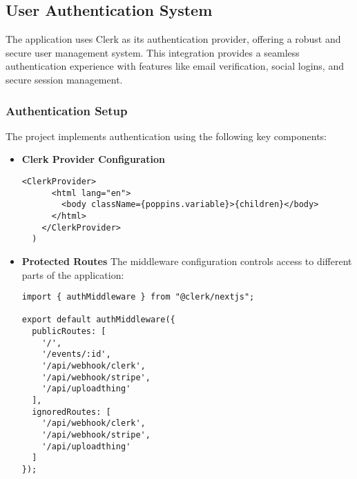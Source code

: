 \subsection{User Authentication System}
The application uses Clerk as its authentication provider, offering a robust and secure user management system. This integration provides a seamless authentication experience with features like email verification, social logins, and secure session management.

\subsubsection{Authentication Setup}
The project implements authentication using the following key components:
\begin{itemize}
    \item \textbf{Clerk Provider Configuration} 
\begin{lstlisting}[style=typescript, caption={Clerk Provider Configuration}]
    <ClerkProvider>
      <html lang="en">
        <body className={poppins.variable}>{children}</body>
      </html>
    </ClerkProvider>
  )
\end{lstlisting}

    \item \textbf{Protected Routes}  
    The middleware configuration controls access to different parts of the application:
\begin{lstlisting}[style=typescript, caption={middleware configuration routes}]
import { authMiddleware } from "@clerk/nextjs";
 
export default authMiddleware({
  publicRoutes: [
    '/',
    '/events/:id',
    '/api/webhook/clerk',
    '/api/webhook/stripe',
    '/api/uploadthing'
  ],
  ignoredRoutes: [
    '/api/webhook/clerk',
    '/api/webhook/stripe',
    '/api/uploadthing'
  ]
});
\end{lstlisting}


    
\end{itemize}



